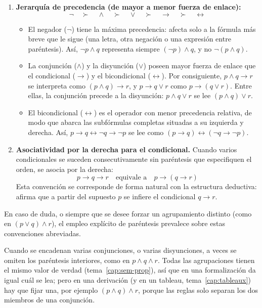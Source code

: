 \begin{enumerate}
    \item \textbf{Jerarquía de precedencia (de mayor a menor fuerza de enlace):}
    \[
    \neg \quad \succ \quad \land \quad \succ \quad \lor \quad \succ \quad \to \quad \succ \quad \leftrightarrow
    \]
    \begin{itemize}
        \item El negador ($\neg$) tiene la máxima precedencia: afecta solo a la fórmula más breve que le sigue (una letra, otra negación o una expresión entre paréntesis). Así, $\neg p \land q$ representa siempre $(\neg p) \land q$, y no $\neg(p \land q)$.
        \item La conjunción ($\land$) y la disyunción ($\lor$) poseen mayor fuerza de enlace que el condicional ($\to$) y el bicondicional ($\leftrightarrow$). Por consiguiente, $p \land q \to r$ se interpreta como $(p \land q) \to r$, y $p \to q \lor r$ como $p \to (q \lor r)$. Entre ellas, la conjunción precede a la disyunción: $p \land q \lor r$ se lee $(p \land q) \lor r$.
        \item El bicondicional ($\leftrightarrow$) es el operador con menor precedencia relativa, de modo que abarca las subfórmulas completas situadas a su izquierda y derecha. Así, $p \to q \leftrightarrow \neg q \to \neg p$ se lee como $(p \to q) \leftrightarrow (\neg q \to \neg p)$.
    \end{itemize}

    \item \textbf{Asociatividad por la derecha para el condicional.}
    Cuando varios condicionales se suceden consecutivamente sin paréntesis que especifiquen el orden, se asocia por la derecha:
    \[
    p \to q \to r \quad \text{equivale a} \quad p \to (q \to r)
    \]
    Esta convención se corresponde de forma natural con la estructura deductiva: afirma que a partir del supuesto $p$ se infiere el condicional $q \to r$.
\end{enumerate}

En caso de duda, o siempre que se desee forzar un agrupamiento distinto (como en $(p \lor q) \land r$), el empleo explícito de paréntesis prevalece sobre estas convenciones abreviadas.

Cuando se encadenan varias conjunciones, o varias disyunciones, a veces se omiten los paréntesis interiores, como en $p \land q \land r$. Todas las agrupaciones tienen el mismo valor de verdad (tema~\ref{cap:sem-prop}), así que en una formalización da igual cuál se lea; pero en una derivación (y en un tableau, tema~\ref{cap:tableaux}) hay que fijar una, por ejemplo $(p \land q) \land r$, porque las reglas solo separan los dos miembros de una conjunción.

